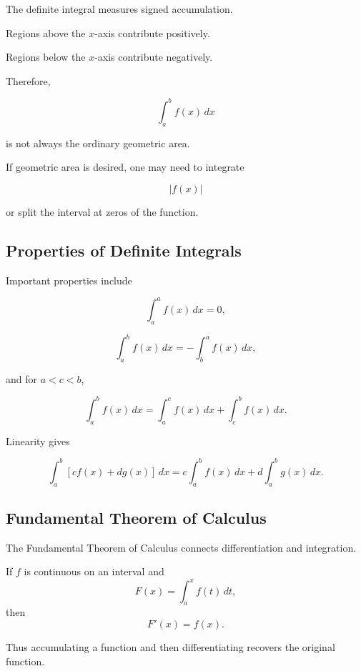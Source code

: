 The definite integral measures signed accumulation.

Regions above the \(x\)-axis contribute positively.

Regions below the \(x\)-axis contribute negatively.

Therefore,

\[ \int_a^b f(x)\,dx \]

is not always the ordinary geometric area.

If geometric area is desired, one may need to integrate

\[ |f(x)| \]

or split the interval at zeros of the function.

\subsection{Properties of Definite Integrals}
\label{subsec:definite-integral-properties}

Important properties include

\[ \int_a^a f(x)\,dx=0, \]

\[ \int_a^b f(x)\,dx=-\int_b^a f(x)\,dx, \]

and for \(a<c<b\),

\[ \int_a^b f(x)\,dx
=
\int_a^c f(x)\,dx
+
\int_c^b f(x)\,dx. \]

Linearity gives

\[ \int_a^b[cf(x)+dg(x)]\,dx
=
c\int_a^b f(x)\,dx
+
d\int_a^b g(x)\,dx. \]

\subsection{Fundamental Theorem of Calculus}
\label{subsec:fundamental-theorem-calculus}

The Fundamental Theorem of Calculus connects differentiation and
integration.

\begin{theorem}
If \(f\) is continuous on an interval and
\[ F(x)=\int_a^x f(t)\,dt, \]
then
\[ F'(x)=f(x). \]
\end{theorem}

Thus accumulating a function and then differentiating recovers the original
function.

